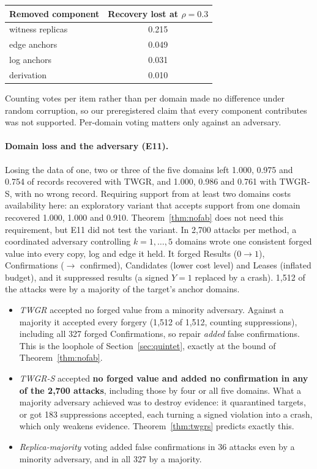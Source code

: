 \documentclass[pdflatex,sn-mathphys-num]{sn-jnl}
\theoremstyle{thmstyleone}
\theoremstyle{thmstyletwo}
\theoremstyle{thmstylethree}
\begin{document}
\begin{center}\small
\begin{tabular}{lc}
\toprule
Removed component & Recovery lost at $\rho=0.3$ \\\midrule
witness replicas & 0.215 \\
edge anchors & 0.049 \\
log anchors & 0.031 \\
derivation & 0.010 \\
\bottomrule
\end{tabular}
\end{center}

Counting votes per item rather than per domain made no difference under random corruption, so our preregistered claim that every component contributes was not supported. Per-domain voting matters only against an adversary.

\paragraph{Domain loss and the adversary (E11).} Losing the data of one, two or three of the five domains left 1.000, 0.975 and 0.754 of records recovered with TWGR, and 1.000, 0.986 and 0.761 with TWGR-S, with no wrong record. Requiring support from at least two domains costs availability here: an exploratory variant that accepts support from one domain recovered 1.000, 1.000 and 0.910. Theorem~\ref{thm:nofab} does not need this requirement, but E11 did not test the variant. In 2{,}700 attacks per method, a coordinated adversary controlling $k=1,\dots,5$ domains wrote one consistent forged value into every copy, log and edge it held. It forged Results ($0\to1$), Confirmations ($\to$ confirmed), Candidates (lower cost level) and Leases (inflated budget), and it suppressed results (a signed $Y=1$ replaced by a crash). 1{,}512 of the attacks were by a majority of the target's anchor domains.
\begin{itemize}
\item \emph{TWGR} accepted no forged value from a minority adversary. Against a majority it accepted every forgery (1{,}512 of 1{,}512, counting suppressions), including all 327 forged Confirmations, so repair \emph{added} false confirmations. This is the loophole of Section~\ref{sec:quintet}, exactly at the bound of Theorem~\ref{thm:nofab}.
\item \emph{TWGR-S} accepted \textbf{no forged value and added no confirmation in any of the 2{,}700 attacks}, including those by four or all five domains. What a majority adversary achieved was to destroy evidence: it quarantined targets, or got 183 suppressions accepted, each turning a signed violation into a crash, which only weakens evidence. Theorem~\ref{thm:twgrs} predicts exactly this.
\item \emph{Replica-majority} voting added false confirmations in 36 attacks even by a minority adversary, and in all 327 by a majority.
\end{itemize}
\end{document}
